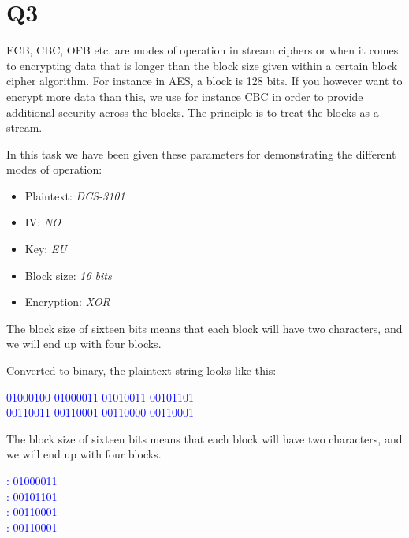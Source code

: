 \documentclass{article}
\begin{document}
\newpage
\section{Q3}

ECB, CBC, OFB etc. are modes of operation in stream ciphers or when it comes to encrypting data that is longer than the block size given within a certain block cipher algorithm. For instance in AES, a block is 128 bits. If you however want to encrypt more data than this, we use for instance CBC in order to provide additional security across the blocks. The principle is to treat the blocks as a stream.

In this task we have been given these parameters for demonstrating the different modes of operation:
\begin{itemize}
\item{Plaintext: \textit{DCS-3101}}
\item{IV: \textit{NO}}
\item{Key: \textit{EU}}
\item{Block size: \textit{16 bits}}
\item{Encryption: \textit{XOR}}
\end{itemize}

The block size of sixteen bits means that each block will have two characters, and we will end up with four blocks.

Converted to binary, the plaintext string looks like this: 
\begin{tcolorbox}
\begin{center}
\textcolor{blue}{01000100 01000011 01010011 00101101 \\00110011 00110001 00110000 00110001}
\end{center}
\end{tcolorbox}

The block size of sixteen bits means that each block will have two characters, and we will end up with four blocks.

\begin{tcolorbox}
\begin{center}
\textcolor{blue}{
: 01000011\\
: 00101101\\
: 00110001\\
: 00110001}
\end{center}
\end{tcolorbox}
\end{document}
